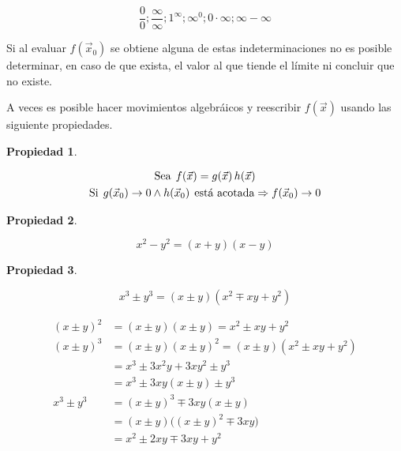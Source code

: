 \documentclass[a5paper,12pt,twoside]{book}
\newtheorem{prop}{{Propiedad}}[chapter]
\begin{document}
\begin{equation*}
    \dfrac{0}{0} ; \dfrac{\infty}{\infty} ; 1^\infty ; \infty^0 ; 0 \cdot \infty ; \infty-\infty
\end{equation*}

Si al evaluar $f(\Vec{x}_0)$ se obtiene alguna de estas indeterminaciones no es posible determinar, en caso de que exista, el valor al que tiende el límite ni concluir que no existe.

A veces es posible hacer movimientos algebráicos y reescribir $f(\Vec{x})$ usando las siguiente propiedades.

\begin{mdframed}[style=MyFrame1]
    \begin{prop}
    \end{prop}
    \begin{gather*}
        \textrm{Sea} \hspace{1ex} f(\Vec{x}) = g(\Vec{x}) \, h(\Vec{x})
        \\
        \textrm{Si} \hspace{1ex} g(\Vec{x}_0) \to 0 \land h(\Vec{x}_0) \hspace{1ex} \textrm{está acotada}
        \Rightarrow f(\Vec{x}_0) \to 0
    \end{gather*}
\end{mdframed}


\begin{mdframed}[style=MyFrame1]
    \begin{prop}
    \end{prop}
    \begin{equation*}
        x^2-y^2 = (x+y)(x-y)
    \end{equation*}
\end{mdframed}

\begin{mdframed}[style=MyFrame1]
    \begin{prop}
    \end{prop}
    \begin{equation*}
        x^3 \pm y^3 = (x \pm y)(x^2 \mp xy + y^2)
    \end{equation*}
\end{mdframed}

\begin{align*}
(x \pm y)^2 &= (x \pm y)(x \pm y)=x^2 \pm xy + y^2
\\
(x \pm y)^3 &= (x \pm y)(x \pm y)^2=(x \pm y)(x^2 \pm xy + y^2)
\\
&= x^3 \pm 3x^2y + 3xy^2 \pm y^3
\\
&= x^3 \pm 3xy(x \pm y) \pm y^3
\\
x^3 \pm y^3 &= (x \pm y)^3 \mp 3xy(x\pm y)
\\
&= (x \pm y) \Big( (x\pm y)^2 \mp 3xy \Big)
\\
&= x^2 \pm 2xy \mp 3xy + y^2
\end{align*}
\end{document}
